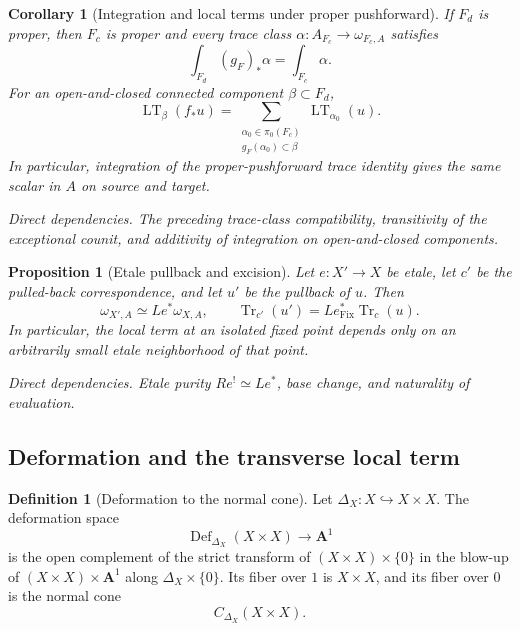 \documentclass[10pt]{article}
\newtheorem{proposition}[theorem]{Proposition}
\newtheorem{corollary}[theorem]{Corollary}
\theoremstyle{definition}
\newtheorem{definition}[theorem]{Definition}
\newcommand{\Fix}{\operatorname{Fix}}
\newcommand{\depends}[1]{\par\smallskip\noindent\textit{Direct dependencies.} #1\par}
\begin{document}
\begin{corollary}[Integration and local terms under proper pushforward]
If \(F_d\) is proper, then \(F_c\) is proper and every trace class
\(\alpha:A_{F_c}\to\omega_{F_c,A}\) satisfies
\[
 \int_{F_d}(g_F)_*\alpha=\int_{F_c}\alpha.
\]
For an open-and-closed connected component \(\beta\subset F_d\),
\[
 \operatorname{LT}_\beta(f_*u)=
 \sum_{\substack{\alpha_0\in\pi_0(F_c)\\g_F(\alpha_0)\subset\beta}}
 \operatorname{LT}_{\alpha_0}(u).
\]
In particular, integration of the proper-pushforward trace identity gives
the same scalar in \(A\) on source and target.
\depends{The preceding trace-class compatibility, transitivity of the
exceptional counit, and additivity of integration on open-and-closed
components.}
\end{corollary}

\begin{proposition}[Etale pullback and excision]
Let \(e:X'\to X\) be etale, let \(c'\) be the pulled-back correspondence,
and let \(u'\) be the pullback of \(u\).  Then
\[
 \omega_{X',A}\simeq Le^*\omega_{X,A},
\qquad
 \operatorname{Tr}_{c'}(u')=
 Le_{\Fix}^*\operatorname{Tr}_c(u).
\]
In particular, the local term at an isolated fixed point depends only on an
arbitrarily small etale neighborhood of that point.
\depends{Etale purity \(Re^!\simeq Le^*\), base change, and naturality of
evaluation.}
\end{proposition}

\subsection{Deformation and the transverse local term}

\begin{definition}[Deformation to the normal cone]
Let \(\Delta_X:X\hookrightarrow X\times X\).  The deformation space
\[
 \operatorname{Def}_{\Delta_X}(X\times X)\longrightarrow\mathbf A^1
\]
is the open complement of the strict transform of
\((X\times X)\times\{0\}\) in the blow-up of
\((X\times X)\times\mathbf A^1\) along
\(\Delta_X\times\{0\}\).  Its fiber over \(1\) is \(X\times X\), and its
fiber over \(0\) is the normal cone
\[
 C_{\Delta_X}(X\times X).
\]
\end{definition}
\end{document}

